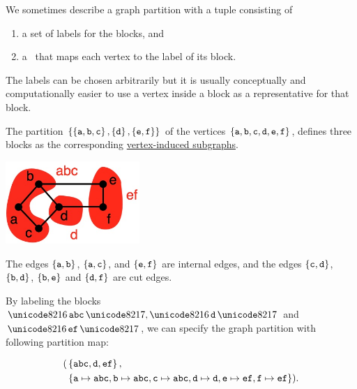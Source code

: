 \begin{flex}
\begin{definition}
\label{def:graphcon::intro::prelim::partition-map}
We sometimes describe a graph partition with a tuple consisting of 
%
\begin{enumerate}
\item a set of labels for the blocks, and 
\item a~ that maps each vertex to the label of its
  block.
\end{enumerate}
%
The labels can be chosen arbitrarily but it is usually conceptually
and computationally easier to use a vertex inside a block as a
representative for that block.
%
\end{definition}

\begin{example}
\label{ex:graphcon::intro::prelim::partition-map}
The partition 
%
$\left\{ \left\{ \texttt{a},\texttt{b},\texttt{c} \right\},\left\{ \texttt{d} \right\},\left\{ \texttt{e},\texttt{f} \right\} \right\}$
%
of the vertices
%
$\left\{ \texttt{a},\texttt{b},\texttt{c},\texttt{d},\texttt{e},\texttt{f} \right\}$, 
%
defines three blocks as the corresponding 
%
\href{def:bg::graphs::subgraph::vi}{vertex-induced subgraphs}.

\begin{center}
  \includegraphics[width=2in]{./graph-contraction/media-introduction/contract-example3.jpg}
\end{center}
The edges $\left\{ \texttt{a},\texttt{b} \right\}$, $\left\{ \texttt{a},\texttt{c} \right\}$,
and $\left\{ \texttt{e},\texttt{f} \right\}$ are internal edges, and the edges
$\left\{ \texttt{c},\texttt{d} \right\}$, $\left\{ \texttt{b},\texttt{d} \right\}$,
$\left\{ \texttt{b},\texttt{e} \right\}$ and $\left\{ \texttt{d},\texttt{f} \right\}$ are
cut edges.

By labeling the blocks $\cstr{abc},\cstr{d}$ and
$\cstr{ef}$, we can specify the graph partition with following partition map:

\begin{alignat}{1}
( & \left\{ \texttt{abc}, \texttt{d}, \texttt{ef} \right\},
\\
 & \left\{ \texttt{a} \mapsto
    \texttt{abc}, \texttt{b} \mapsto \texttt{abc}, \texttt{c} \mapsto
    \texttt{abc}, \texttt{d} \mapsto \texttt{d}, \texttt{e} \mapsto
    \texttt{ef}, \texttt{f} \mapsto \texttt{ef} \right\}
).
\end{alignat}


\end{example}
\end{flex}
